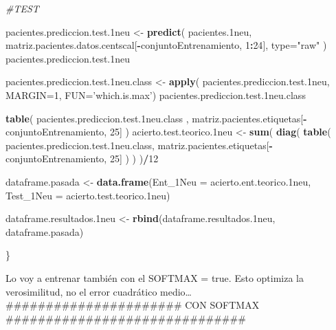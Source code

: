 \documentclass[]{article}
\newenvironment{Shaded}{\begin{snugshade}}{\end{snugshade}}
\newcommand{\KeywordTok}[1]{\textcolor[rgb]{0.13,0.29,0.53}{\textbf{#1}}}
\newcommand{\DataTypeTok}[1]{\textcolor[rgb]{0.13,0.29,0.53}{#1}}
\newcommand{\DecValTok}[1]{\textcolor[rgb]{0.00,0.00,0.81}{#1}}
\newcommand{\StringTok}[1]{\textcolor[rgb]{0.31,0.60,0.02}{#1}}
\newcommand{\CommentTok}[1]{\textcolor[rgb]{0.56,0.35,0.01}{\textit{#1}}}
\newcommand{\OperatorTok}[1]{\textcolor[rgb]{0.81,0.36,0.00}{\textbf{#1}}}
\newcommand{\NormalTok}[1]{#1}
\begin{document}
\begin{Shaded}
\begin{Highlighting}[]
  \CommentTok{#TEST}
  
\NormalTok{  pacientes.prediccion.test.1neu <-}\StringTok{ }\KeywordTok{predict}\NormalTok{( pacientes.1neu, matriz.pacientes.datos.centscal[}\OperatorTok{-}\NormalTok{conjuntoEntrenamiento, }\DecValTok{1}\OperatorTok{:}\DecValTok{24}\NormalTok{], }\DataTypeTok{type=}\StringTok{"raw"}\NormalTok{ )}
\NormalTok{  pacientes.prediccion.test.1neu}
  
\NormalTok{  pacientes.prediccion.test.1neu.class <-}\StringTok{ }\KeywordTok{apply}\NormalTok{( pacientes.prediccion.test.1neu, }\DataTypeTok{MARGIN=}\DecValTok{1}\NormalTok{, }\DataTypeTok{FUN=}\StringTok{'which.is.max'}\NormalTok{)}
\NormalTok{  pacientes.prediccion.test.1neu.class}
  
  \KeywordTok{table}\NormalTok{( pacientes.prediccion.test.1neu.class , matriz.pacientes.etiquetas[}\OperatorTok{-}\NormalTok{conjuntoEntrenamiento, }\DecValTok{25}\NormalTok{] )}
\NormalTok{  acierto.test.teorico.1neu <-}\StringTok{ }\KeywordTok{sum}\NormalTok{( }\KeywordTok{diag}\NormalTok{( }\KeywordTok{table}\NormalTok{( pacientes.prediccion.test.1neu.class, matriz.pacientes.etiquetas[}\OperatorTok{-}\NormalTok{conjuntoEntrenamiento, }\DecValTok{25}\NormalTok{] ) ) )}\OperatorTok{/}\DecValTok{12}
  
\NormalTok{  dataframe.pasada <-}\StringTok{ }\KeywordTok{data.frame}\NormalTok{(}\DataTypeTok{Ent_1Neu =}\NormalTok{ acierto.ent.teorico.1neu,}
                                 \DataTypeTok{Test_1Neu =}\NormalTok{ acierto.test.teorico.1neu)}
  
\NormalTok{  dataframe.resultados.1neu <-}\StringTok{ }\KeywordTok{rbind}\NormalTok{(dataframe.resultados.1neu, dataframe.pasada)}

\NormalTok{\}}
\end{Highlighting}
\end{Shaded}

Lo voy a entrenar también con el SOFTMAX = true. Esto optimiza la
verosimilitud, no el error cuadrático medio\ldots{}
\#\#\#\#\#\#\#\#\#\#\#\#\#\#\#\#\#\#\#\#\#\# CON SOFTMAX
\#\#\#\#\#\#\#\#\#\#\#\#\#\#\#\#\#\#\#\#\#\#\#\#\#\#\#\#\#\#
\end{document}
